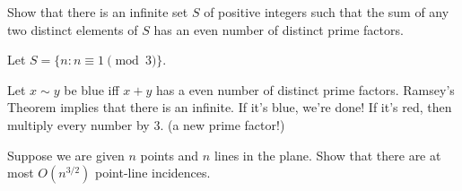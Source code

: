 \documentclass[10pt, a4paper]{article}
\begin{document}
\newpage
\begin{prob}
	Show that there is an infinite set $S$ of positive integers such that the sum of any two distinct elements of $S$ has an even number of distinct prime factors.
\end{prob}
\begin{sk}
	Let $S = \{n : n \equiv 1 \pmod{3}\}$.

	Let $x \sim y$ be blue iff $x + y$ has a even number of distinct prime factors. Ramsey's Theorem implies that there is an infinite. If it's blue, we're done! If it's red, then multiply every number by $3$. (a new prime factor!)
\end{sk}

\newpage
\begin{prob}
	Suppose we are given $n$ points and $n$ lines in the plane. Show that there are at most $O(n^{3/2})$ point-line incidences.
\end{prob}
\begin{sol}
	
\end{sol}
\end{document}
